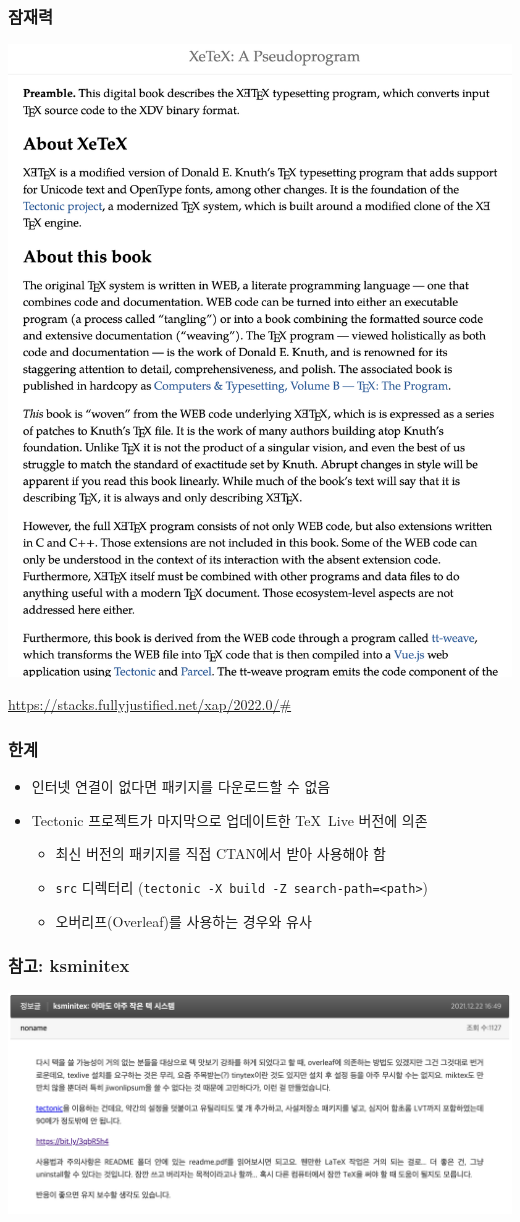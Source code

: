 \begin{frame}[c,fragile]
  \frametitle{잠재력}

  \begin{center}
    \includegraphics[width=0.5\linewidth]{xap.png}
  \end{center}
  \url{https://stacks.fullyjustified.net/xap/2022.0/#}
\end{frame}

\begin{frame}[c,fragile]
  \frametitle{한계}

  \begin{itemize}
    \item 인터넷 연결이 없다면 패키지를 다운로드할 수 없음
    \item Tectonic 프로젝트가 마지막으로 업데이트한 \TeX\ Live 버전에 의존
    \begin{itemize}
      \item 최신 버전의 패키지를 직접 CTAN에서 받아 사용해야 함
      \item \verb/src/ 디렉터리 (\verb/tectonic -X build -Z search-path=<path>/)
      \item 오버리프(Overleaf)를 사용하는 경우와 유사
    \end{itemize}
  \end{itemize}
\end{frame}

\begin{frame}[c]
  \frametitle{참고: ksminitex}

  \begin{center}
    \includegraphics[width=\linewidth]{ksminitex.png}
  \end{center}
\end{frame}


